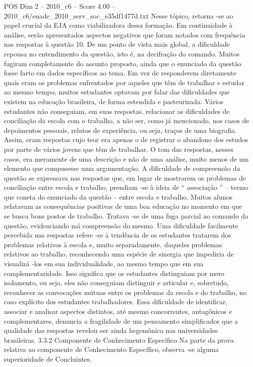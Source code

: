 \begin{textsample}{POS Dim 2 – 2010\_c6 – Score 4.00 – 2010\_c6/enade\_2010\_serv\_soc\_e35df1477d.txt}
Nesse tópico, retorna -se ao papel crucial da EJA como viabilizadora dessa formação.
Em continuidade à análise, serão apresentados aspectos negativos que foram notados com frequência nas respostas à questão 10.
De um ponto de vista mais global, a dificuldade repousa no entendimento da questão, isto é, na decifração do comando.
Muitos fugiram completamente do assunto proposto, ainda que o enunciado da questão fosse farto em dados específicos ao tema.
Em vez de responderem diretamente quais eram os problemas enfrentados por aqueles que têm de trabalhar e estudar ao mesmo tempo, muitos estudantes optavam por falar das dificuldades que existem na educação brasileira, de forma estendida e pasteurizada.
Vários estudantes não conseguiam, em suas respostas, relacionar as dificuldades de conciliação da escola com o trabalho, a não ser, como já mencionado, nos casos de depoimentos pessoais, relatos de experiência, ou seja, traços de uma biografia.
Assim, eram respostas cujo teor era apenas o de registrar o abandono dos estudos por parte de vários jovens que têm de trabalhar.
O tom das respostas, nesses casos, era meramente de uma descrição e não de uma análise, muito menos de um elemento que compusesse uma argumentação.
A dificuldade de compreensão da questão se expressava nas respostas que, em lugar de mostrarem os problemas de conciliação entre escola e trabalho, prendiam -se à ideia de “ associação ” – termo que consta do enunciado da questão – entre escola e trabalho.
Muitos alunos relatavam as consequências positivas de uma boa educação no momento em que se busca bons postos de trabalho.
Tratava -se de uma fuga parcial ao comando da questão, evidenciando má compreensão do mesmo.
Uma dificuldade facilmente percebida nas respostas refere -se à tendência de os estudantes tratarem dos problemas relativos à escola e, muito separadamente, daqueles problemas relativos ao trabalho, reconhecendo uma espécie de sinergia que impediria de visualizá -los em sua individualidade, ao mesmo tempo que em sua complementaridade.
Isso significa que os estudantes distinguiam por mero isolamento, ou seja, eles não conseguiam distinguir e articular e, sobretudo, reconhecer as convocações mútuas entre os problemas da escola e do trabalho, no caso explícito dos estudantes trabalhadores.
Essa dificuldade de identificar, associar e analisar aspectos distintos, até mesmo concorrentes, antagônicos e complementares, denuncia a fragilidade de um pensamento simplificador que a qualidade das respostas revelou ser ainda hegemônico nas universidades brasileiras. 3.3.2 Componente de Conhecimento Específico Na parte da prova relativa ao componente de Conhecimento Específico, observa -se alguma superioridade de Concluintes.

\end{textsample}
